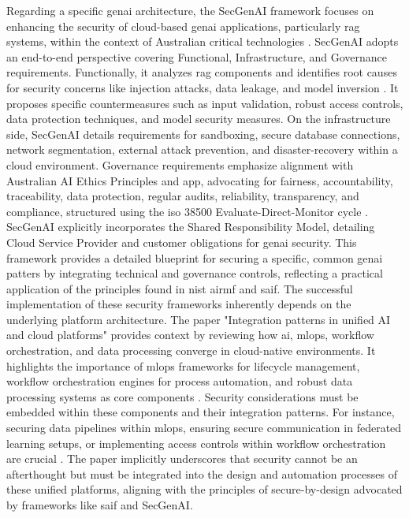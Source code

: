 Regarding a specific \gls{genai} architecture, the SecGenAI framework focuses on enhancing the security of cloud-based \gls{genai} applications, particularly \gls{rag} systems, within the context of Australian critical technologies \cite{haryanto_secgenai_2024}. SecGenAI adopts an end-to-end perspective covering Functional, Infrastructure, and Governance requirements. Functionally, it analyzes \gls{rag} components and identifies root causes for security concerns like injection attacks, data leakage, and model inversion \cite{haryanto_secgenai_2024}. It proposes specific countermeasures such as input validation, robust access controls, data protection techniques, and model security measures\cite{haryanto_secgenai_2024}. On the infrastructure side, SecGenAI details requirements for sandboxing, secure database connections, network segmentation, external attack prevention, and \gls{disaster-recovery} within a cloud environment\cite{haryanto_secgenai_2024}. Governance requirements emphasize alignment with Australian AI Ethics Principles and \gls{app}, advocating for fairness, accountability, traceability, data protection, regular audits, reliability, transparency, and compliance, structured using the \gls{iso} 38500 Evaluate-Direct-Monitor cycle \cite{noauthor_isoiec_nodate}. SecGenAI explicitly incorporates the Shared Responsibility Model, detailing Cloud Service Provider and customer obligations for \gls{genai} security\cite{haryanto_secgenai_2024}. This framework provides a detailed blueprint for securing a specific, common \gls{genai} patters by integrating technical and governance controls, reflecting a practical application of the principles found in \gls{nist} \gls{airmf} and \gls{saif}.
The successful implementation of these security frameworks inherently depends on the underlying platform architecture. The paper "Integration patterns in unified AI and cloud platforms" provides context by reviewing how \gls{ai}, \gls{mlops}, workflow \gls{orchestration}, and data processing converge in \gls{cloud-native} environments\cite{sushil_prabhu_prabhakaran_integration_2024}. It highlights the importance of \gls{mlops} frameworks for lifecycle management, workflow \gls{orchestration} engines for process automation, and robust data processing systems as core components \cite{sushil_prabhu_prabhakaran_integration_2024}. Security considerations must be embedded within these components and their integration patterns. For instance, securing data pipelines within \gls{mlops}, ensuring secure communication in federated learning setups, or implementing access controls within workflow \gls{orchestration} are crucial \cite{sushil_prabhu_prabhakaran_integration_2024, hansen_introducing_2023, haryanto_secgenai_2024}. The paper implicitly underscores that security cannot be an afterthought but must be integrated into the design and automation processes of these unified platforms, aligning with the principles of secure-by-design advocated by frameworks like \gls{saif} and SecGenAI.
